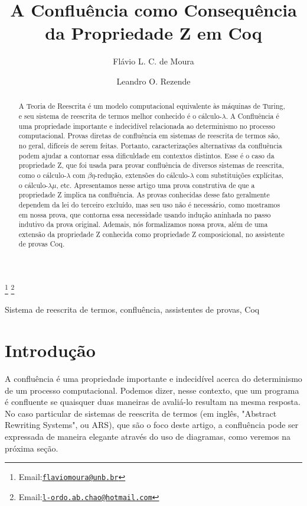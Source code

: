 \documentclass{entcs}
\begin{document}
\begin{frontmatter}
  \title{A Confluência como Consequência da Propriedade Z em Coq}
  \author{Flávio L. C. de Moura}
  \author{Leandro O. Rezende}
  \address{Departamento de Ciência da Computação, Universidade de Brasília, Brasília, Brasil}
  \thanks[flaviomoura]{Email:\href{flaviomoura@unb.br}{\texttt{\normalshape flaviomoura@unb.br}}} 
  \thanks[leandro]{Email:\href{l-ordo.ab.chao@hotmail.com}{\texttt{\normalshape l-ordo.ab.chao@hotmail.com}}}
  
\begin{abstract}
  A Teoria de Reescrita é um modelo computacional equivalente às
  máquinas de Turing, e seu sistema de reescrita de termos melhor conhecido 
  é o cálculo-$\lambda$. A Confluência é uma propriedade importante e indecidível 
  relacionada ao determinismo no processo computacional. Provas diretas 
  de confluência em sistemas de reescrita de termos são, no geral, difíceis de serem 
  feitas. Portanto, caracterizações alternativas da confluência podem 
  ajudar a contornar essa dificuldade em contextos distintos. Esse é o caso da propriedade 
  Z, que foi usada para provar confluência de diversos sistemas de reescrita, como 
  o cálculo-$\lambda$ com $\beta\eta$-redução, extensões do cálculo-$\lambda$ com
  substituições explícitas, o cálculo-$\lambda\mu$, etc. Apresentamos nesse artigo uma
  prova construtiva de que a propriedade Z implica na confluência. As provas conhecidas 
  desse fato geralmente dependem da lei do terceiro excluído, mas seu uso não é 
  necessário, como mostramos em nossa prova, que contorna essa necessidade usando 
  indução aninhada no passo indutivo da prova original.
  Ademais, nós formalizamos nossa prova, além de uma extensão da propriedade Z
  conhecida como propriedade Z composicional, no assistente de provas Coq.
\end{abstract}

\begin{keyword}
  Sistema de reescrita de termos, confluência, assistentes de provas, Coq
\end{keyword}
\end{frontmatter}

\section{Introdução}

A confluência é uma propriedade importante e indecidível acerca do 
determinismo de um processo computacional. Podemos dizer, nesse 
contexto, que um programa é confluente se quaisquer duas maneiras de 
avaliá-lo resultam na mesma resposta. No caso particular de sistemas de 
reescrita de termos (em inglês, "Abstract Rewriting Systems", ou ARS), que são o foco deste artigo, a confluência 
pode ser expressada de maneira elegante através do uso de diagramas, 
como veremos na próxima seção.
\end{document}
